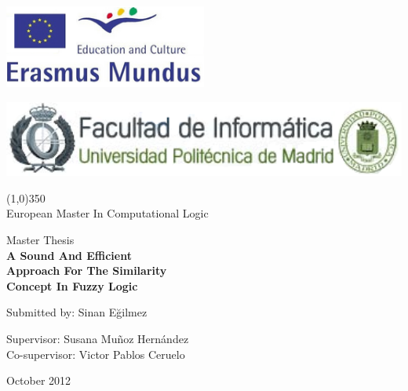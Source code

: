 
\begin{titlepage}
\centering

\includegraphics[width=0.5\textwidth]{erasmusMundus.png}

\includegraphics[width=1\textwidth]{logofi.png}
\begin{center}
\line(1,0){350}\\
European Master In Computational Logic
\end{center}

\vfill



{\large Master Thesis}\\
\vspace{1cm}
{\huge {\sffamily\bfseries A Sound And Efficient } } \\
\vspace{0.3cm}
{\huge{ \sffamily\bfseries Approach For The Similarity} } \\
\vspace{0.3cm}
{\huge{ \sffamily\bfseries  Concept  In Fuzzy Logic} }


\vfill

{\Large Submitted by: Sinan E\u{g}ilmez}

\vspace{1cm}
{\Large Supervisor: Susana Mu\~noz Hern\'andez }\\
{\Large Co-supervisor: Victor Pablos Ceruelo } \\
\vspace{1cm}

{\Large October 2012}
\cleardoublepage
\end{titlepage}